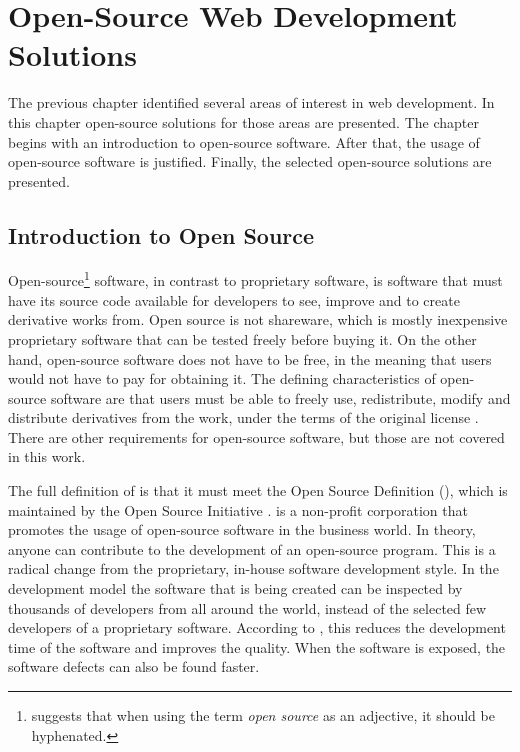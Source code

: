 \chapter{Open-Source Web Development Solutions}
\label{toc:oss}

The previous chapter identified several areas of interest in web 
development. In this chapter open-source solutions for those areas are 
presented. The chapter begins with an introduction to open-source 
software. After that, the usage of open-source software is justified. 
Finally, the selected open-source solutions are presented.


\section{Introduction to Open Source}
\label{toc:oss:intro}

Open-source\footnote{\citep{osi} suggests that when using the term
\textsl{open source} as an adjective, it should be hyphenated.} 
software, in contrast to proprietary software, is software that must 
have its source code available for developers to see, improve and to 
create derivative works from. Open source is not shareware, which is 
mostly inexpensive proprietary software that can be tested freely 
before buying it. On the other hand, open-source software does not 
have to be free, in the meaning that users would not have to pay for 
obtaining it. The defining characteristics of open-source software are 
that users must be able to freely use, redistribute, modify and 
distribute derivatives from the work, under the terms of the original 
license \citep{ossolutions}. There are other requirements for 
open-source software, but those are not covered in this work.

The full definition of  is that it must meet the Open 
Source Definition (), which is maintained by the Open 
Source Initiative \citep{osi}.  is a non-profit 
corporation that promotes the usage of open-source software in the 
business world. In theory, anyone can contribute to the development of 
an open-source program. This is a radical change from the proprietary, 
in-house software development style. In the  development 
model the software that is being created can be inspected by thousands 
of developers from all around the world, instead of the selected few 
developers of a proprietary software. According to \cite{osi}, this 
reduces the development time of the software and improves the quality. 
When the software is exposed, the software defects can also be found 
faster.

